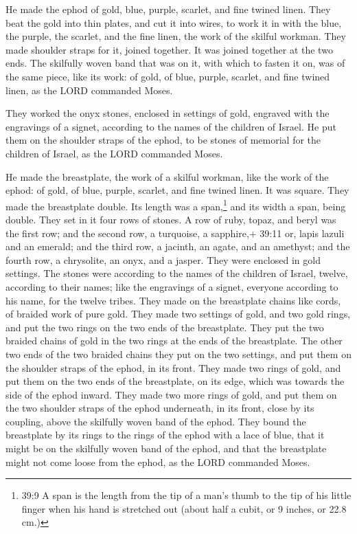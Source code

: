  He made the ephod of gold, blue, purple, scarlet, and fine
twined linen.  They beat the gold into thin plates, and cut
it into wires, to work it in with the blue, the purple, the scarlet, and
the fine linen, the work of the skilful workman.  They made
shoulder straps for it, joined together. It was joined together at the
two ends.  The skilfully woven band that was on it, with
which to fasten it on, was of the same piece, like its work: of gold, of
blue, purple, scarlet, and fine twined linen, as the LORD commanded
Moses.

 They worked the onyx stones, enclosed in settings of gold,
engraved with the engravings of a signet, according to the names of the
children of Israel.  He put them on the shoulder straps of
the ephod, to be stones of memorial for the children of Israel, as the
LORD commanded Moses.

 He made the breastplate, the work of a skilful workman,
like the work of the ephod: of gold, of blue, purple, scarlet, and fine
twined linen.  It was square. They made the breastplate
double. Its length was a span,\footnote{39:9 A span is the length from
  the tip of a man's thumb to the tip of his little finger when his hand
  is stretched out (about half a cubit, or 9 inches, or 22.8 cm.)} and
its width a span, being double.  They set in it four rows
of stones. A row of ruby, topaz, and beryl was the first row;
 and the second row, a turquoise, a sapphire,+ 39:11 or,
lapis lazuli and an emerald;  and the third row, a jacinth,
an agate, and an amethyst;  and the fourth row, a
chrysolite, an onyx, and a jasper. They were enclosed in gold settings.
 The stones were according to the names of the children of
Israel, twelve, according to their names; like the engravings of a
signet, everyone according to his name, for the twelve tribes.
 They made on the breastplate chains like cords, of braided
work of pure gold.  They made two settings of gold, and two
gold rings, and put the two rings on the two ends of the breastplate.
 They put the two braided chains of gold in the two rings
at the ends of the breastplate.  The other two ends of the
two braided chains they put on the two settings, and put them on the
shoulder straps of the ephod, in its front.  They made two
rings of gold, and put them on the two ends of the breastplate, on its
edge, which was towards the side of the ephod inward.  They
made two more rings of gold, and put them on the two shoulder straps of
the ephod underneath, in its front, close by its coupling, above the
skilfully woven band of the ephod.  They bound the
breastplate by its rings to the rings of the ephod with a lace of blue,
that it might be on the skilfully woven band of the ephod, and that the
breastplate might not come loose from the ephod, as the LORD commanded
Moses.

